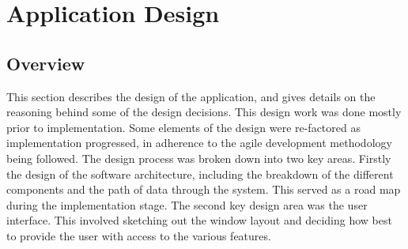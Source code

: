 
\chapter[Application Design]{Application Design} %

\label{Chapter8} %


\section{Overview}
This section describes the design of the application, and gives details on the reasoning behind some of the design decisions. This design work was done mostly prior to implementation. Some elements of the design were re-factored as implementation progressed, in adherence to the agile development methodology being followed. The design process was broken down into two key areas. Firstly the design of the software architecture, including the breakdown of the different components and the path of data through the system. This served as a road map during the implementation stage. The second key design area was the user interface. This involved sketching out the window layout and deciding how best to provide the user with access to the various features.


